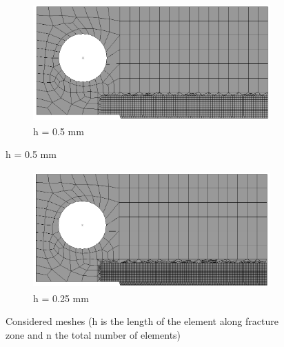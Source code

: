 \documentclass[12pt,a4paper,twoside,openright]{report}
\begin{document}
\begin{figure}[htbp!]\ContinuedFloat
\hspace*{2cm}
\begin{subfigure}{0.4\textwidth}
\begin{center}
\includegraphics[width=10cm,height=4.5cm]{26.h=0.5mm.png}
 \caption{h = 0.5 mm}
 \label{fig:0.5mm}
  \end{center}
 \end{subfigure}
\end{figure}
\FloatBarrier

\begin{figure}[htbp!]\ContinuedFloat
\hspace*{2cm}
\begin{subfigure}{0.4\textwidth}
\begin{center}
\includegraphics[width=10cm,height=4.5cm]{26.h=0.25mm.png}
 \caption{h = 0.25 mm}
 \label{fig:0.25mm}
  \end{center}
 \end{subfigure}
     \caption{Considered meshes (h is the length of the element along fracture zone and n the total number of elements) }
    \label{fig:Considered meshes 2}
\end{figure}
\FloatBarrier
\end{document}
